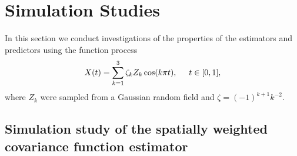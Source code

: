 
\section{Simulation Studies} 

\label{sec:numerical_experiments}

In this section we conduct investigations of the properties of the estimators and predictors using the function process
\begin{equation}
	X(t) = \sum^{3}_{k=1}\zeta_k Z_k \cos(k\pi t), \hspace{0.5cm} t \in [0,1], 
	\label{eq:sim process2} 
\end{equation}
where $Z_k$ were sampled from a Gaussian random field and \(\zeta=(-1)^{k+1}k^{-2}\). 


\subsection{Simulation study of the spatially weighted covariance function estimator} %
\label{sub:simulation covariance}




